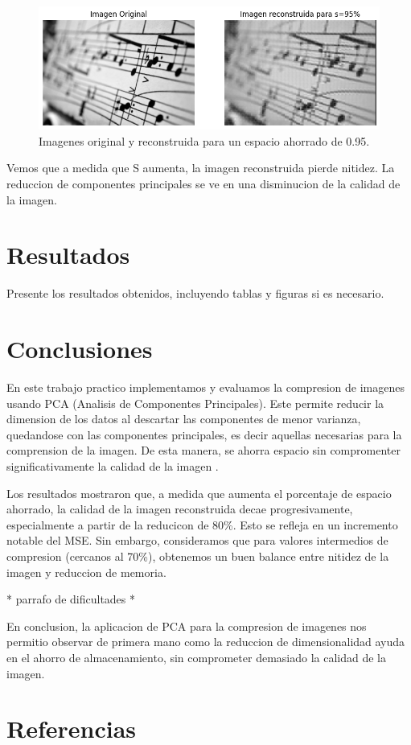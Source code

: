 \documentclass[a4paper,12pt]{article}
\begin{document}
\begin{figure}[H]
    \centering
    \includegraphics[width=1\textwidth]{Ejercicio 4b95.png}
    \caption{Imagenes original y reconstruida para un espacio ahorrado de 0.95.}
    \label{fig:ej4b5}
\end{figure}
Vemos que a medida que S aumenta, la imagen reconstruida pierde nitidez. La reduccion de 
componentes principales se ve en una disminucion de la calidad de la imagen. 

\section{Resultados}
Presente los resultados obtenidos, incluyendo tablas y figuras si es necesario.

\section{Conclusiones}
En este trabajo practico implementamos y evaluamos la compresion de imagenes usando 
PCA (Analisis de Componentes Principales). Este permite reducir la dimension de los datos
al descartar las componentes de menor varianza, quedandose con las componentes principales, 
es decir aquellas necesarias para la comprension de la imagen. De esta manera, se ahorra espacio 
sin compromenter significativamente la calidad de la imagen .

Los resultados mostraron que, a medida que aumenta el porcentaje de espacio ahorrado, la calidad
de la imagen reconstruida decae progresivamente, especialmente a partir de la reducicon de 80\%. 
Esto se refleja en un incremento notable del MSE. Sin embargo, consideramos que
para valores intermedios de compresion (cercanos al 70\%), obtenemos un buen balance entre nitidez 
de la imagen y reduccion de memoria. 

* parrafo de dificultades *

En conclusion, la aplicacion de PCA para la compresion de imagenes nos permitio observar
de primera mano como la reduccion de dimensionalidad ayuda en el ahorro de almacenamiento,
sin comprometer demasiado la calidad de la imagen.



\section*{Referencias}


\end{document}

